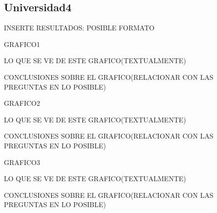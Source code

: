 \subsection{Universidad4}


INSERTE RESULTADOS: POSIBLE FORMATO

GRAFICO1

LO QUE SE VE DE ESTE GRAFICO(TEXTUALMENTE)

CONCLUSIONES SOBRE EL GRAFICO(RELACIONAR CON LAS PREGUNTAS EN LO POSIBLE)


GRAFICO2

LO QUE SE VE DE ESTE GRAFICO(TEXTUALMENTE)

CONCLUSIONES SOBRE EL GRAFICO(RELACIONAR CON LAS PREGUNTAS EN LO POSIBLE)


GRAFICO3

LO QUE SE VE DE ESTE GRAFICO(TEXTUALMENTE)

CONCLUSIONES SOBRE EL GRAFICO(RELACIONAR CON LAS PREGUNTAS EN LO POSIBLE)
